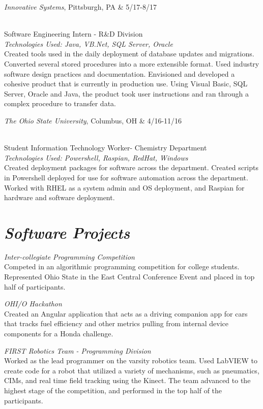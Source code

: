 \documentclass[]{res}
\begin{document}
{			\begin{ncolumn}{2}
			{\it Innovative Systems}, Pittsburgh, PA  & \hfill   5/17-8/17
			\end{ncolumn}\\
			Software Engineering Intern - R\&D Division \\
			{\textit{\footnotesize{Technologies Used: Java, VB.Net, SQL Server, Oracle}}}\\
			Created tools used in the daily deployment of database updates and migrations. Converted several stored procedures into a more extensible format. Used industry software design practices and documentation. Envisioned and developed a cohesive product that is currently in production use. Using Visual Basic, SQL Server, Oracle and Java, the product took user instructions and ran through a complex procedure to transfer data.
			
			
			\begin{ncolumn}{2} 
			{\it The Ohio State University}, Columbus, OH & \hfill  4/16-11/16 
			\end{ncolumn}\\
			Student Information Technology Worker- Chemistry Department \\
			{\textit{\footnotesize{Technologies Used: Powershell, Raspian, RedHat, Windows}}}\\
			Created deployment packages for software across the department. Created scripts in Powershell deployed for use for software automation across the department. Worked with RHEL as a system admin and OS deployment, and Raspian for hardware and software deployment.
			

			\section{\sl  \textbf{Software Projects}}
			
			\textit{Inter-collegiate Programming Competition}\\
			Competed in an algorithmic programming competition for college students. Represented Ohio State in the East Central Conference Event and placed in top half of participants.
			
			\textit{OHI/O Hackathon}\\
			Created an Angular application that acts as a driving companion app for cars that tracks fuel efficiency and other metrics pulling from internal device components for a Honda challenge.
			
			\textit{FIRST Robotics Team - Programming Division}\\
			Worked as the lead programmer on the varsity robotics team. Used LabVIEW to create code for a robot that utilized a variety of mechanisms, such as pneumatics, CIMs, and real time field tracking using the Kinect.
			The team advanced to the highest stage of the competition, and performed in the top half of the participants.
			
}
\end{document}
